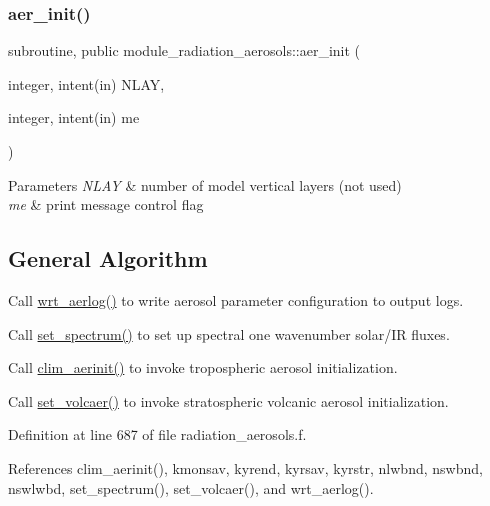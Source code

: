 \subsubsection{\texorpdfstring{aer\+\_\+init()}{aer\_init()}}
{\footnotesize\ttfamily subroutine, public module\+\_\+radiation\+\_\+aerosols\+::aer\+\_\+init (\begin{DoxyParamCaption}\item[{integer, intent(in)}]{N\+L\+AY,  }\item[{integer, intent(in)}]{me }\end{DoxyParamCaption})}


\begin{DoxyParams}{Parameters}
{\em N\+L\+AY} & number of model vertical layers (not used) \\
\hline
{\em me} & print message control flag \\
\hline
\end{DoxyParams}
\hypertarget{group___g_f_s__ozn_gen_al}{}\subsection{General Algorithm}\label{group___g_f_s__ozn_gen_al}

\begin{DoxyEnumerate}
\item Call \hyperlink{group__module__radiation__aerosols_ga3135fdf318002f9d56dd2d93225f4aac}{wrt\+\_\+aerlog()} to write aerosol parameter configuration to output logs.
\item Call \hyperlink{group__module__radiation__aerosols_gaa7fe6dc2964bc474a132b93aaab82cb0}{set\+\_\+spectrum()} to set up spectral one wavenumber solar/\+IR fluxes.
\item Call \hyperlink{group__module__radiation__aerosols_gacdc24d7d4c01b97920ef940cc01c9cc0}{clim\+\_\+aerinit()} to invoke tropospheric aerosol initialization.
\item Call \hyperlink{group__module__radiation__aerosols_ga9b4558586df512eab092565549b835e2}{set\+\_\+volcaer()} to invoke stratospheric volcanic aerosol initialization. 
\end{DoxyEnumerate}

Definition at line 687 of file radiation\+\_\+aerosols.\+f.



References clim\+\_\+aerinit(), kmonsav, kyrend, kyrsav, kyrstr, nlwbnd, nswbnd, nswlwbd, set\+\_\+spectrum(), set\+\_\+volcaer(), and wrt\+\_\+aerlog().



